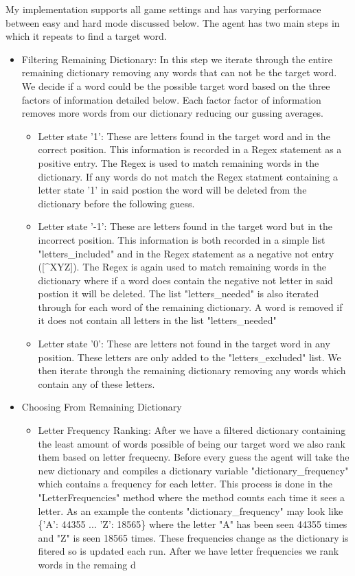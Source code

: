 \documentclass[12pt]{article}
\begin{document}
My implementation supports all game settings and has varying performace between easy and hard mode discussed below. The agent has two main steps in which it repeats to find a target word.
\begin{itemize}
\item Filtering Remaining Dictionary: In this step we iterate through the entire remaining dictionary removing any words that can not be the target word. We decide if a word could be the possible target word based on the three factors of information detailed below. Each factor factor of information removes more words from our dictionary reducing our gussing averages. \begin{itemize}
            \item Letter state '1': These are letters found in the target word and in the correct position. This information is recorded in a Regex statement as a positive entry. The Regex is used to match remaining words in the dictionary. If any words do not match the Regex statment containing a letter state '1' in said postion the word will be deleted from the dictionary before the following guess.
      \end{itemize}
      \begin{itemize}
            \item Letter state '-1': These are letters found in the target word but in the incorrect position. This information is both recorded in a simple list "letters_included" and in the Regex statement as a negative not entry ([^XYZ]). The Regex is again used to match remaining words in the dictionary where if a word does contain the negative not letter in said postion it will be deleted. The list "letters_needed" is also iterated through for each word of the remaining dictionary. A word is removed if it does not contain all letters in the list "letters_needed"
      \end{itemize}
      \begin{itemize}
            \item Letter state '0': These are letters not found in the target word in any position. These letters are only added to the "letters_excluded" list. We then iterate through the remaining dictionary removing any words which contain any of these letters.
      \end{itemize}
\item Choosing From Remaining Dictionary
      \begin{itemize}
            \item Letter Frequency Ranking: After we have a filtered dictionary containing the least amount of words possible of being our target word we also rank them based on letter frequecny. Before every guess the agent will take the new dictionary and compiles a dictionary variable "dictionary_frequency" which contains a frequency for each letter. This process is done in the "LetterFrequencies" method where the method counts each time it sees a letter. As an example the contents "dictionary_frequency" may look like \{'A': 44355 ... 'Z': 18565\} where the letter "A" has been seen 44355 times and "Z" is seen 18565 times. These frequencies change as the dictionary is fitered so is updated each run. After we have letter frequencies we rank words in the remaing d

\end{itemize}
\end{itemize}
\end{document}
